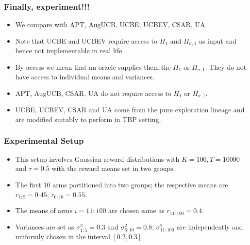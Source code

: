 %    


\begin{frame}
\frametitle{Finally, experiment!!!}
\begin{itemize}
\item<1-> We compare with APT, AugUCB, UCBE, UCBEV, CSAR, UA.
\item<2-> Note that UCBE and UCBEV require access to $H_1$ and $H_{\sigma, 1}$ as input and hence not implementable in real life. 
\item<2-> By access we mean that an oracle supplies them the $H_1$ or $H_{\sigma, 1}$. They do not have access to individual means and variances.
\item<3-> APT, AugUCB, CSAR, UA do not require access to $H_1$ or $H_{\sigma, 1}$.
\item<4-> UCBE, UCBEV, CSAR and UA come from the pure exploration lineage and are modified suitably to perform in TBP setting.
\end{itemize}
\end{frame}

\begin{frame}
\frametitle{Experimental Setup}
\begin{itemize}
\item<1-> This setup involves Gaussian reward distributions with $K=100, T=10000$ and $\tau=0.5$ with the reward means set in two groups.
\item<2-> The first $10$ arms partitioned into two groups; the respective means are $r_{1:5}=0.45$, $r_{6:10}=0.55$.
\item<3-> The means of arms $i=11:100$ are chosen same as $r_{11:100}=0.4$.
\item<3-> Variances are set as $\sigma_{1:5}^{2}=0.3$ and $\sigma_{6:10}^{2}=0.8$;  $\sigma_{11:100}^{2}$ are independently and uniformly chosen in the interval $[0.2,0.3]$. 
\end{itemize}
\end{frame}



